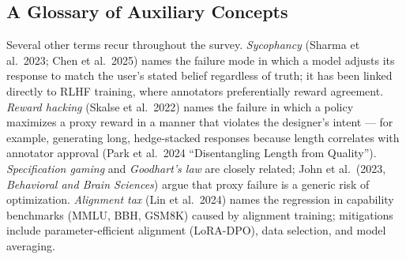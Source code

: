\subsection{A Glossary of Auxiliary Concepts}\label{a-glossary-of-auxiliary-concepts}

Several other terms recur throughout the survey. \emph{Sycophancy} (Sharma et al.~2023; Chen et al.~2025) names the failure mode in which a model adjusts its response to match the user's stated belief regardless of truth; it has been linked directly to RLHF training, where annotators preferentially reward agreement. \emph{Reward hacking} (Skalse et al.~2022) names the failure in which a policy maximizes a proxy reward in a manner that violates the designer's intent --- for example, generating long, hedge-stacked responses because length correlates with annotator approval (Park et al.~2024 ``Disentangling Length from Quality''). \emph{Specification gaming} and \emph{Goodhart's law} are closely related; John et al.~(2023, \emph{Behavioral and Brain Sciences}) argue that proxy failure is a generic risk of optimization. \emph{Alignment tax} (Lin et al.~2024) names the regression in capability benchmarks (MMLU, BBH, GSM8K) caused by alignment training; mitigations include parameter-efficient alignment (LoRA-DPO), data selection, and model averaging.

